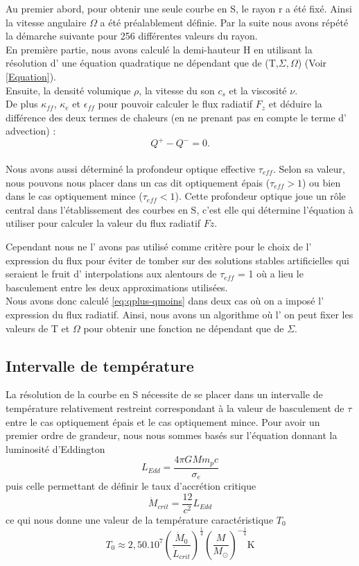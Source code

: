 Au premier abord, pour obtenir une seule courbe en S, le rayon r a été fixé. Ainsi la vitesse angulaire $\Omega$ a été préalablement définie. Par la suite nous avons répété la démarche suivante pour 256 différentes valeurs du rayon.
\\
En première partie, nous avons calculé la demi-hauteur H en utilisant la résolution d' une équation quadratique ne dépendant que de (T,$\Sigma,\Omega$) (Voir \ref{Equation}).
\\
Ensuite, la densité volumique $\rho$, la vitesse du son $c_s$ et la viscosité $\nu$. 
\\
De plus $\kappa_{ff}$, $\kappa_{e}$ et $\epsilon_{ff}$ pour pouvoir calculer le flux radiatif $F_z$ et déduire la différence des deux termes de chaleurs (en ne prenant pas en compte le terme d' advection) :
\\
\begin{equation} 
\label{eq:qplus-qmoins}
Q^+ - Q^- = 0. 
\end{equation}
\\
Nous avons aussi déterminé la profondeur optique effective $\tau_{eff}$. Selon sa valeur, nous pouvons nous placer dans un cas dit optiquement épais ($\tau_{eff} > 1$) ou bien dans le cas optiquement mince  ($\tau_{eff} < 1$). Cette profondeur optique joue un rôle central dans l'établissement des courbes en S, c'est elle qui détermine l'équation à utiliser pour calculer la valeur du flux radiatif $Fz$.

Cependant nous ne l' avons pas utilisé comme critère pour le choix de l' expression du flux pour éviter de tomber sur des solutions stables artificielles qui seraient le fruit d' interpolations aux alentours de $\tau_{eff}$ = 1 où a lieu le basculement entre les deux approximations utilisées. 
\\
Nous avons donc calculé \ref{eq:qplus-qmoins} dans deux cas où on a imposé l' expression du flux radiatif. Ainsi, nous avons un algorithme où l' on peut fixer les valeurs de T et $\Omega$ pour obtenir une fonction ne dépendant que de $\Sigma$.

\subsection{Intervalle de température}
La résolution de la courbe en S nécessite de se placer dans un intervalle de température relativement restreint correspondant à la valeur de basculement de $\tau$ entre le cas optiquement épais et le cas optiquement mince.
Pour avoir un premier ordre de grandeur, nous nous sommes basés sur l'équation donnant la luminosité d'Eddington 
\begin{equation}
L_{Edd} = \frac{4\pi GMm_pc}{\sigma_e}
\end{equation}
puis celle permettant de définir le taux d’accrétion critique 
\begin{equation}
\dot{M}_{crit} = \frac{12}{c^2}L_{Edd} 
\end{equation}
ce qui nous donne une valeur de la température caractéristique $T_0$
\begin{equation}
T_0 \approx 2,50.10^7\left(\frac{\dot{M}_0}{\dot{L}_{crit}}\right)^{\frac{1}{4}}\left(\frac{M}{M_\odot}\right)^{-\frac{1}{4}} \mathrm{K}
\end{equation}

